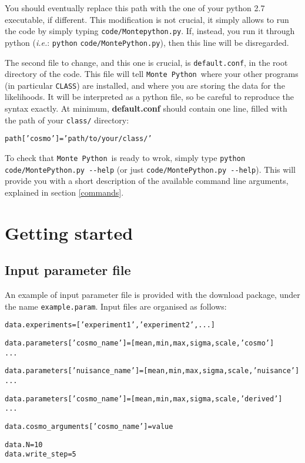 \documentclass[10pt]{article}
\newcommand{\CLASS}{\texttt{CLASS}}
\newcommand{\MP}{\texttt{Monte Python}}
\begin{document}
 You should eventually replace this path with the one of your python 2.7 executable, if different.
 This modification is not crucial, it simply allows to run the code by simply typing \verb?code/Montepython.py?.
 If, instead, you run it through python (\emph{i.e.}: \verb?python?
 \verb?code/MontePython.py?), then this line will be disregarded.

 The second file to change, and this one is crucial, is \verb?default.conf?, in
 the root directory of the code. This file will tell \MP\, where your
 other programs (in particular \CLASS) are installed, and where you are storing the data for the
 likelihoods. It will be interpreted as a python file, so be careful to
 reproduce the syntax exactly. At minimum, {\bf default.conf} should contain one line, filled with the path of your \verb?class/? directory:
 \begin{alltt}
   path['cosmo']   = 'path/to/your/class/'
 \end{alltt}
 
 
 To check that \MP~is ready to wrok, simply type \verb?python code/MontePython.py --help? (or just \verb?code/MontePython.py --help?). This will provide you with a short description of the available command line arguments, explained in section \ref{commands}. 

\section{Getting started}

\subsection{Input parameter file}

An example of input parameter file is provided with the download package, under the name \verb?example.param?. Input files are organised as follows:

  \begin{alltt}
    data.experiments = ['experiment1', 'experiment2', ...]
    
    data.parameters['cosmo_name']       = [mean, min, max, sigma, scale, 'cosmo']
    ...

    data.parameters['nuisance_name']    = [mean, min, max, sigma, scale, 'nuisance']
    ...

    data.parameters['cosmo_name']       = [mean, min, max, sigma, scale, 'derived']
    ...

    data.cosmo_arguments['cosmo_name']           = value

    data.N = 10
    data.write_step = 5
  \end{alltt}
\end{document}
